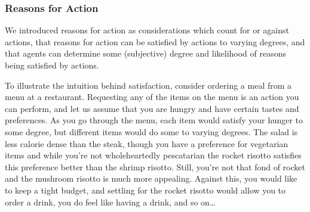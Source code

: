 \documentclass[10pt]{article}
\begin{document}
\subsubsection{Reasons for Action}
\label{sec:reasons-action}


We introduced reasons for action as considerations which count for or against actions, that reasons for action can be satisfied by actions to varying degrees, and that agents can determine some (subjective) degree and likelihood of reasons being satisfied by actions.

To illustrate the intuition behind satisfaction, consider ordering a meal from a menu at a restaurant.
Requesting any of the items on the menu is an action you can perform, and let us assume that you are hungry and have certain tastes and preferences.
As you go through the menu, each item would satisfy your hunger to some degree, but different items would do some to varying degrees.
The salad is less calorie dense than the steak, though you have a preference for vegetarian items and while you're not wholeheartedly pescatarian the rocket risotto satisfies this preference better than the shrimp risotto.
Still, you're not that fond of rocket and the mushroom risotto is much more appealing.
Against this, you would like to keep a tight budget, and settling for the rocket risotto would allow you to order a drink, you do feel like having a drink, and so on\dots
\end{document}
